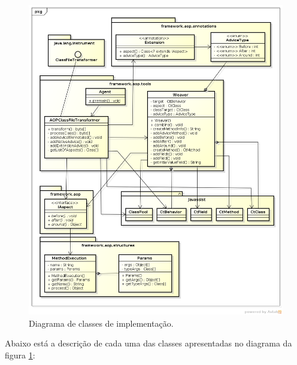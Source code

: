 \documentclass[tc,oneside]{iiufrgs}
\begin{document}
\begin{figure}[ht]
	\centering
	\includegraphics[scale=0.4]{diagramas/Framework_AOP.png}
	\caption{Diagrama de classes de implementação.}
	\label{fig:diagramaClassesAOP}
\end{figure}

Abaixo está a descrição de cada uma das classes apresentadas no diagrama da figura \ref{fig:diagramaClassesAOP}:
\end{document}
